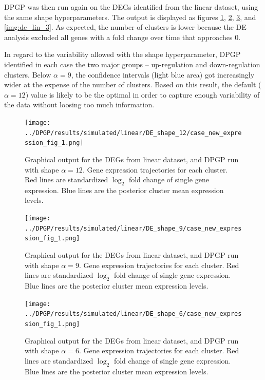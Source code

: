 DPGP was then run again on the DEGs identified from the linear dataset, using the same shape hyperparameters. The output is displayed as figures \ref{img:de_lin_12}, \ref{img:de_lin_9}, \ref{img:de_lin_6}, and \ref{img:de_lin_3}. As expected, the number of clusters is lower because the DE analysis excluded all genes with a fold change over time that approaches 0.

In regard to the variability allowed with the shape hyperparameter, DPGP identified in each case the two major groups -- up-regulation and down-regulation clusters. Below $\alpha=9$, the confidence intervals (light blue area) got increasingly wider at the expense of the number of clusters. Based on this result, the default ($\alpha=12$) value is likely to be the optimal in order to capture enough variability of the data without loosing too much information. 

\begin{figure}[!hp]
    \centering
    \texttt{[image: ../DPGP/results/simulated/linear/DE\_shape\_12/case\_new\_expression\_fig\_1.png]}
    \caption[DPGP output for DEG linear dataset, shape 12]{Graphical output for the DEGs from linear dataset, and DPGP run with shape $\alpha=12$. Gene expression trajectories for each cluster. Red lines are standardized $\log_{2}$ fold change of single gene expression. Blue lines are the posterior cluster mean expression levels.}\label{img:de_lin_12}
\end{figure}

\begin{figure}[!hp]
    \centering
    \texttt{[image: ../DPGP/results/simulated/linear/DE\_shape\_9/case\_new\_expression\_fig\_1.png]}
    \caption[DPGP output for DEG linear dataset, shape 9]{Graphical output for the DEGs from linear dataset, and DPGP run with shape $\alpha=9$. Gene expression trajectories for each cluster. Red lines are standardized $\log_{2}$ fold change of single gene expression. Blue lines are the posterior cluster mean expression levels.}\label{img:de_lin_9}
\end{figure}

\begin{figure}[!hp]
    \centering
    \texttt{[image: ../DPGP/results/simulated/linear/DE\_shape\_6/case\_new\_expression\_fig\_1.png]}
    \caption[DPGP output for DEG linear dataset, shape 6]{Graphical output for the DEGs from linear dataset, and DPGP run with shape $\alpha=6$. Gene expression trajectories for each cluster. Red lines are standardized $\log_{2}$ fold change of single gene expression. Blue lines are the posterior cluster mean expression levels.}\label{img:de_lin_6}
\end{figure}

